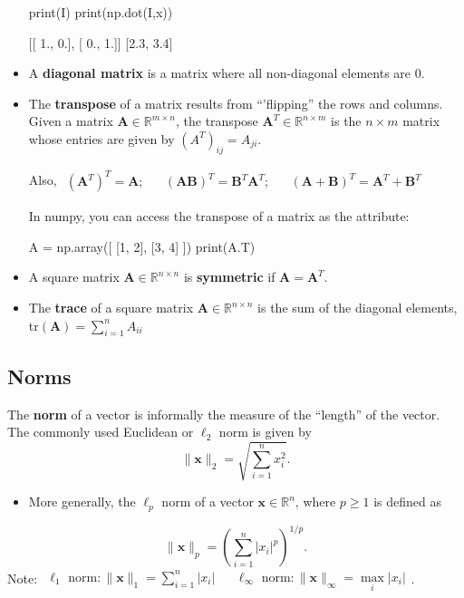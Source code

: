 \begin{itemize}
\begin{python}
print(I)
print(np.dot(I,x))

[[ 1.,  0.],
 [ 0.,  1.]]
[2.3, 3.4]
\end{python}

\item A {\bf diagonal matrix} is a matrix where all non-diagonal elements are $0$.


\item The {\bf transpose} of a matrix results from ``'flipping'' the rows and columns. 
Given a matrix $\textbf{A} \in \mathbb{R}^{m\times n}$, the transpose $\textbf{A}^{T} \in \mathbb{R}^{n\times m}$
is the $n \times m$ matrix whose entries are given by $(A^{T})_{ij}= A_{ji}$.

Also, $\begin{array}{ccccc}(\textbf{A}^{T})^{T}= \textbf{A}; &  & (\textbf{AB})^{T}=\textbf{B}^{T}\textbf{A}^{T}; & & (\textbf{A}+\textbf{B})^{T}= \textbf{A}^{T}+\textbf{B}^{T} \end{array}$

In numpy, you can access the transpose of a matrix as the  attribute:

\begin{python}
A = np.array([ [1, 2], [3, 4] ])
print(A.T)
\end{python}

\item A square matrix $\textbf{A} \in \mathbb{R}^{n\times n}$ is {\bf symmetric} if  $\textbf{A}=\textbf{A}^{T}$.

\item The {\bf trace} of a square matrix $\textbf{A} \in \mathbb{R}^{n\times n}$ is the sum of the diagonal
elements, tr$(\textbf{A})= \sum\limits_{i=1}^{n} A_{ii}$

\end{itemize}
\subsection{Norms}
The {\bf norm} of a vector is informally the measure of the ``length'' of the vector. The commonly used Euclidean or $\ell_{2}$ norm is given by
\begin{equation*}
\|\textbf{x}\|_{2}=\sqrt{\sum\limits_{i=1}^{n} x_{i}^{2}}.
\end{equation*}

\begin{itemize}
\item More generally, the $\ell_{p}$ norm of a vector $\textbf{x} \in \mathbb{R}^{n}$, where $p \geq 1$ is defined as 
\end{itemize}
\begin{equation*}
\|\textbf{x}\|_{p}=\left(\sum\limits_{i=1}^{n}|x_{i}|^{p}\right)^{1/p}.
\end{equation*}
Note: $\begin{array}{ccc} \ell_{1} \text{ norm}: \|\textbf{x}\|_{1} = \sum\limits_{i=1}^{n} |x_{i}| && \ell_{\infty} \text{ norm}: \|\textbf{x}\|_{\infty} = \max\limits_{i} |x_{i}| \end{array}$.

